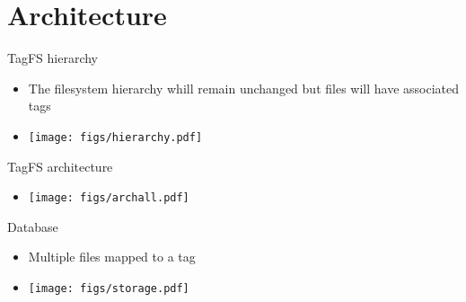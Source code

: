 \documentclass{beamer}
\begin{document}
\section{Architecture}
\begin{frame}{TagFS hierarchy}
\begin{itemize}
	\item {The filesystem hierarchy whill remain unchanged but files will have associated tags}
	\item{\texttt{[image: figs/hierarchy.pdf]}}
\end{itemize}
\end{frame}

\begin{frame}{TagFS architecture}
\begin{itemize} 
	\item {\texttt{[image: figs/archall.pdf]}}
\end{itemize}
\end{frame}

\begin{frame}{Database}
\begin{itemize} 
	\item{Multiple files mapped to a tag}
	\item {\texttt{[image: figs/storage.pdf]}}
\end{itemize}
\end{frame}
\end{document}
